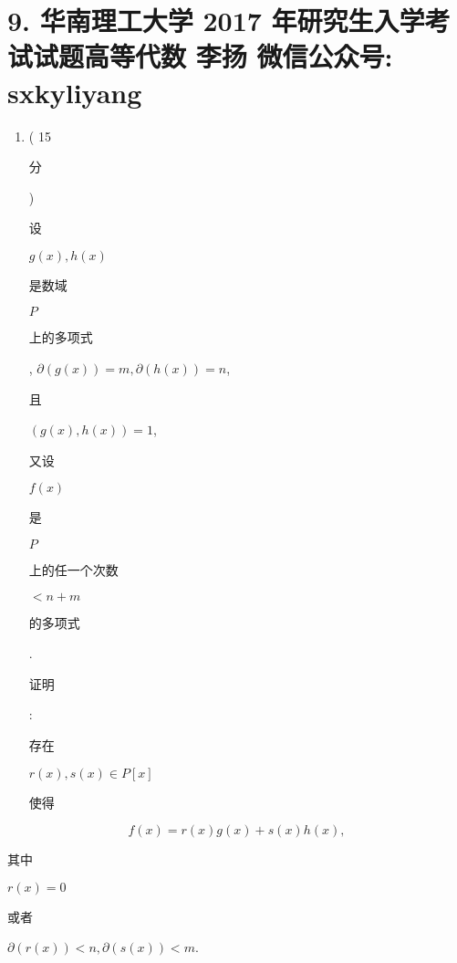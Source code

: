 \documentclass[10pt]{article}
\begin{document}
\section{9. 华南理工大学 2017 年研究生入学考试试题高等代数 
 李扬 
 微信公众号: sxkyliyang}
\begin{enumerate}
  \item ( 15 \begin{CJK}{UTF8}{mj}分\end{CJK}) \begin{CJK}{UTF8}{mj}设\end{CJK} $g(x), h(x)$ \begin{CJK}{UTF8}{mj}是数域\end{CJK} $P$ \begin{CJK}{UTF8}{mj}上的多项式\end{CJK}, $\partial(g(x))=m, \partial(h(x))=n$, \begin{CJK}{UTF8}{mj}且\end{CJK} $(g(x), h(x))=1$, \begin{CJK}{UTF8}{mj}又设\end{CJK} $f(x)$ \begin{CJK}{UTF8}{mj}是\end{CJK} $P$ \begin{CJK}{UTF8}{mj}上的任一个次数\end{CJK} $<n+m$ \begin{CJK}{UTF8}{mj}的多项式\end{CJK}. \begin{CJK}{UTF8}{mj}证明\end{CJK}: \begin{CJK}{UTF8}{mj}存在\end{CJK} $r(x), s(x) \in P[x]$ \begin{CJK}{UTF8}{mj}使得\end{CJK}
\end{enumerate}
$$
f(x)=r(x) g(x)+s(x) h(x),
$$
\begin{CJK}{UTF8}{mj}其中\end{CJK} $r(x)=0$ \begin{CJK}{UTF8}{mj}或者\end{CJK} $\partial(r(x))<n, \partial(s(x))<m$.
\end{document}
